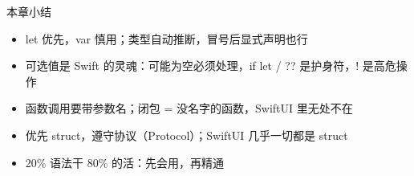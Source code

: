 \begin{tcbsummary}{本章小结}
\begin{itemize}
  \item let 优先，var 慎用；类型自动推断，冒号后显式声明也行
  \item 可选值是 Swift 的灵魂：可能为空必须处理，if let / ?? 是护身符，! 是高危操作
  \item 函数调用要带参数名；闭包 = 没名字的函数，SwiftUI 里无处不在
  \item 优先 struct，遵守协议（Protocol）；SwiftUI 几乎一切都是 struct
  \item 20\% 语法干 80\% 的活：先会用，再精通
\end{itemize}

\end{tcbsummary}
